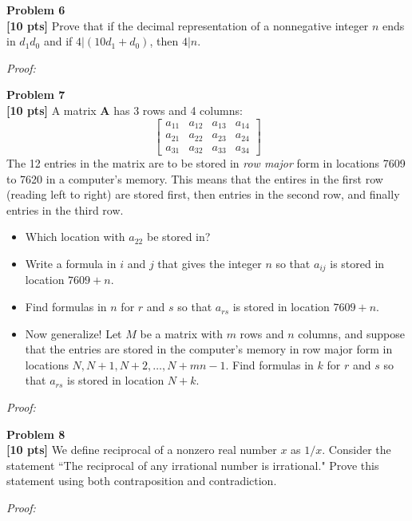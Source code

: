 \documentclass{article}
\newenvironment{problem}[2][Problem]
    { \begin{mdframed}[backgroundcolor=gray!20] \textbf{#1 #2} \\}
    {  \end{mdframed}}
\newenvironment{solution}
    {\textit{Proof:}}
    {}
\begin{document}
\begin{problem}{6}
\textbf{[10 pts]} Prove that if the decimal representation of a nonnegative integer $n$ ends in $d_1 d_0$ and if $4 | (10d_1 + d_0)$, then $4|n$.
\end{problem}
\begin{solution}
\end{solution}

\newpage
\begin{problem}{7}
\textbf{[10 pts]} A matrix $\textbf{A}$ has 3 rows and 4 columns:
\[
    \begin{bmatrix} 
        a_{11} & a_{12} & a_{13} & a_{14} \\
        a_{21} & a_{22} & a_{23} & a_{24} \\
        a_{31} & a_{32} & a_{33} & a_{34} 
    \end{bmatrix}
\]
The 12 entries in the matrix are to be stored in \textit{row major} form in locations 7609 to 7620 in a computer's memory. This means that the entires in the first row (reading left to right) are stored first, then entries in the second row, and finally entries in the third row.
\begin{itemize}
    \item Which location with $a_{22}$ be stored in?
    \item Write a formula in $i$ and $j$ that gives the integer $n$ so that $a_{ij}$ is stored in location $7609 + n$. 
    \item Find formulas in $n$ for $r$ and $s$ so that $a_{rs}$ is stored in location $7609 + n$.
    \item Now generalize! Let $M$ be a matrix with $m$ rows and $n$ columns, and suppose that the entries are stored in the computer's memory in row major form in locations $N, N+1, N+2, \ldots, N+mn-1$. Find formulas in $k$ for $r$ and $s$ so that $a_{rs}$ is stored in location $N+k$.
\end{itemize}
\end{problem}

\begin{solution}
\end{solution}

\begin{problem}{8}
\textbf{[10 pts]} We define reciprocal of a nonzero real number $x$ as $1/x$. Consider the statement ``The reciprocal of any irrational number is irrational."  Prove this statement using both contraposition and contradiction.
\end{problem}
\begin{solution}
\end{solution}
\end{document}
